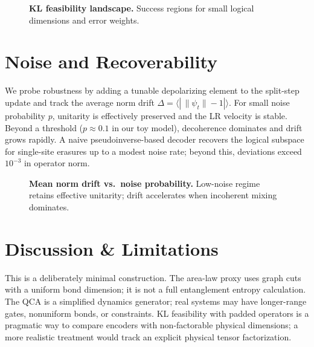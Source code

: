 \documentclass[11pt]{article}
\begin{document}
\begin{figure}[ht]
  \centering
  \caption{\textbf{KL feasibility landscape.} Success regions for small logical dimensions and error weights.}
  \label{fig:kl}
\end{figure}

\section{Noise and Recoverability}
We probe robustness by adding a tunable depolarizing element to the split-step update and track the average norm drift
$\Delta = \langle |\,\|\psi_t\| - 1|\rangle$.
For small noise probability $p$, unitarity is effectively preserved and the LR velocity is stable. Beyond a threshold ($p \approx 0.1$ in our toy model), decoherence dominates and drift grows rapidly. A naive pseudoinverse-based decoder recovers the logical subspace for single-site erasures up to a modest noise rate; beyond this, deviations exceed $10^{-3}$ in operator norm.

\begin{figure}[ht]
  \centering
  \caption{\textbf{Mean norm drift vs.\ noise probability.} Low-noise regime retains effective unitarity; drift accelerates when incoherent mixing dominates.}
  \label{fig:noise}
\end{figure}

\section{Discussion \& Limitations}
This is a deliberately minimal construction. The area-law proxy uses graph cuts with a uniform bond dimension; it is not a full entanglement entropy calculation. The QCA is a simplified dynamics generator; real systems may have longer-range gates, nonuniform bonds, or constraints. KL feasibility with padded operators is a pragmatic way to compare encoders with non-factorable physical dimensions; a more realistic treatment would track an explicit physical tensor factorization.
\end{document}

